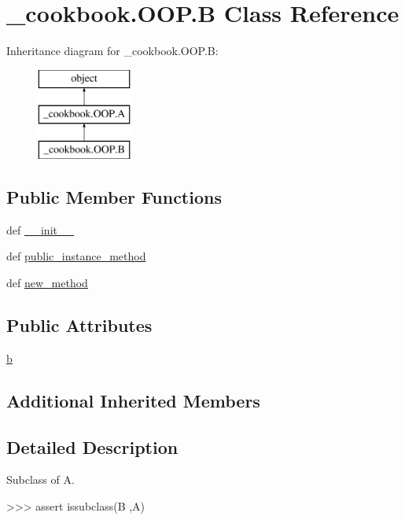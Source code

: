 \hypertarget{class__cookbook_1_1OOP_1_1B}{\section{\-\_\-cookbook.\-O\-O\-P.\-B Class Reference}
\label{class__cookbook_1_1OOP_1_1B}
}
Inheritance diagram for \-\_\-cookbook.\-O\-O\-P.\-B\-:\begin{figure}[H]
\begin{center}
\leavevmode
\includegraphics[height=3.000000cm]{d1/d62/class__cookbook_1_1OOP_1_1B}
\end{center}
\end{figure}
\subsection*{Public Member Functions}
\begin{DoxyCompactItemize}
\item 
def \hyperlink{class__cookbook_1_1OOP_1_1B_a9f3c49f91e93d0cfe607e9046b100c43}{\-\_\-\-\_\-init\-\_\-\-\_\-}
\item 
def \hyperlink{class__cookbook_1_1OOP_1_1B_aabb3a6d83ad9d362a6b88fbdd270d4f0}{public\-\_\-instance\-\_\-method}
\item 
def \hyperlink{class__cookbook_1_1OOP_1_1B_aa55b30a2f61c6106811984627635d98c}{new\-\_\-method}
\end{DoxyCompactItemize}
\subsection*{Public Attributes}
\begin{DoxyCompactItemize}
\item 
\hyperlink{class__cookbook_1_1OOP_1_1B_a19d2deae2721c44646f69f1718a1c2b4}{b}
\end{DoxyCompactItemize}
\subsection*{Additional Inherited Members}


\subsection{Detailed Description}
\begin{DoxyVerb}Subclass of A.

    >>> assert issubclass(B ,A)\end{DoxyVerb}
 

